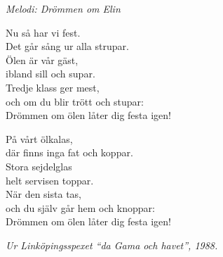 {\footnotesize\textit{Melodi: Drömmen om Elin}}\par
\vspace{10pt}
Nu så har vi fest.\\
Det går sång ur alla strupar.\\
Ölen är vår gäst,\\
ibland sill och supar.\\
Tredje klass ger mest,\\
och om du blir trött och stupar:\\
Drömmen om ölen låter dig festa igen!\par
\vspace{10pt}
På vårt ölkalas,\\
där finns inga fat och koppar.\\
Stora sejdelglas\\
helt servisen toppar.\\
När den sista tas,\\
och du själv går hem och knoppar:\\
Drömmen om ölen låter dig festa igen!\par
\vspace{10pt}
{\footnotesize\textit{Ur Linköpingsspexet ``da Gama och havet'', 1988.}}
